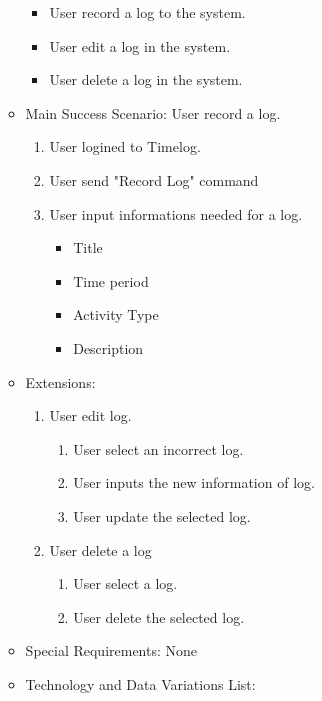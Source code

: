 \documentclass[12pt, a4paper]{article}
\begin{document}
\begin{CJK*}{UTF8}{bkai}
\begin{enumerate}
\begin{itemize}
            \begin{itemize}
              \item User record a log to the system.
              \item User edit a log in the system.
              \item User delete a log in the system.
            \end{itemize}
          \item Main Success Scenario: User record a log.
            \begin{enumerate}
              \item User logined to Timelog.
              \item User send "Record Log" command
              \item User input informations needed for a log.
                \begin{itemize}
                  \item Title
                  \item Time period
                  \item Activity Type
                  \item Description
                \end{itemize}
            \end{enumerate}
          \item Extensions:
            \begin{enumerate}
              \item User edit log.
                \begin{enumerate}
                  \item User select an incorrect log.
                  \item User inputs the new information of log.
                  \item User update the selected log.
                \end{enumerate}
              \item User delete a log
                \begin{enumerate}
                  \item User select a log.
                  \item User delete the selected log.
                \end{enumerate}
            \end{enumerate}
          \item Special Requirements: None
          \item Technology and Data Variations List:

\end{itemize}
\end{enumerate}
\end{CJK*}
\end{document}
